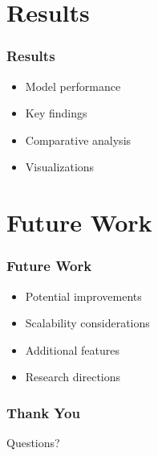 \documentclass{beamer}
\begin{document}
\section{Results}
\begin{frame}
\frametitle{Results}
\begin{itemize}
    \item Model performance
    \item Key findings
    \item Comparative analysis
    \item Visualizations
\end{itemize}
\end{frame}

\section{Future Work}
\begin{frame}
\frametitle{Future Work}
\begin{itemize}
    \item Potential improvements
    \item Scalability considerations
    \item Additional features
    \item Research directions
\end{itemize}
\end{frame}

\begin{frame}
\frametitle{Thank You}
\begin{center}
    Questions?
\end{center}
\end{frame}
\end{document}
